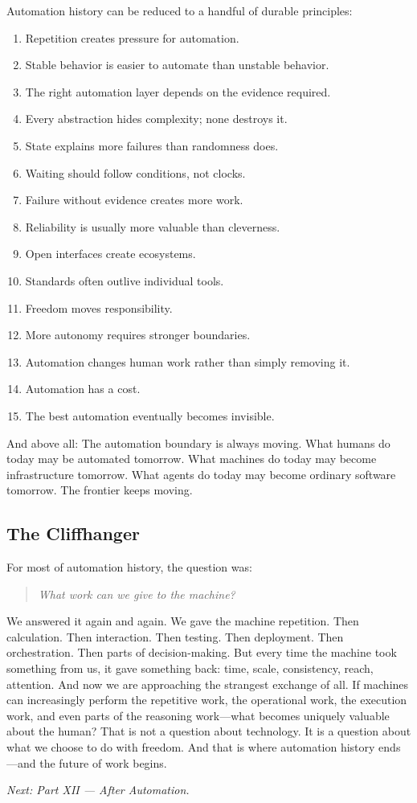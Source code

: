 \documentclass[11pt,twoside]{book}
\begin{document}
Automation history can be reduced to a handful of durable principles:
\begin{enumerate}[nosep]
    \item Repetition creates pressure for automation.
    \item Stable behavior is easier to automate than unstable behavior.
    \item The right automation layer depends on the evidence required.
    \item Every abstraction hides complexity; none destroys it.
    \item State explains more failures than randomness does.
    \item Waiting should follow conditions, not clocks.
    \item Failure without evidence creates more work.
    \item Reliability is usually more valuable than cleverness.
    \item Open interfaces create ecosystems.
    \item Standards often outlive individual tools.
    \item Freedom moves responsibility.
    \item More autonomy requires stronger boundaries.
    \item Automation changes human work rather than simply removing it.
    \item Automation has a cost.
    \item The best automation eventually becomes invisible.
\end{enumerate}
And above all:
The automation boundary is always moving.
What humans do today may be automated tomorrow.
What machines do today may become infrastructure tomorrow.
What agents do today may become ordinary software tomorrow.
The frontier keeps moving.

\subsection*{The Cliffhanger}

For most of automation history, the question was:
\begin{quote}
\emph{What work can we give to the machine?}
\end{quote}
We answered it again and again.
We gave the machine repetition.
Then calculation.
Then interaction.
Then testing.
Then deployment.
Then orchestration.
Then parts of decision-making.
But every time the machine took something from us, it gave something back: time, scale, consistency, reach, attention.
And now we are approaching the strangest exchange of all.
If machines can increasingly perform the repetitive work, the operational work, the execution work, and even parts of the reasoning work---what becomes uniquely valuable about the human?
That is not a question about technology.
It is a question about what we choose to do with freedom.
And that is where automation history ends---and the future of work begins.

\begin{center}
\vspace{1em}
\textit{Next: Part XII — After Automation.}
\end{center}
\end{document}
